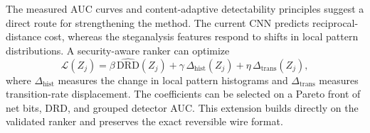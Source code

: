 \RevisionAddBegin
The measured AUC curves and content-adaptive detectability principles
\cite{Sedighi2018Content} suggest a direct route for strengthening the method.
The current CNN predicts reciprocal-distance cost, whereas the steganalysis
\RevisionAddEnd
features respond to shifts in local pattern distributions. A security-aware
ranker can optimize
\begin{equation}
\mathcal{L}(Z_j)=
\beta\,\widehat{\mathrm{DRD}}(Z_j)
+\gamma\,\Delta_{\mathrm{hist}}(Z_j)
+\eta\,\Delta_{\mathrm{trans}}(Z_j),
\label{eq:security-aware-ranker}
\end{equation}
where $\Delta_{\mathrm{hist}}$ measures the change in local pattern histograms
and $\Delta_{\mathrm{trans}}$ measures transition-rate displacement. The
coefficients can be selected on a Pareto front of net bits, DRD, and grouped
detector AUC. This extension builds directly on the validated ranker and
preserves the exact reversible wire format.

